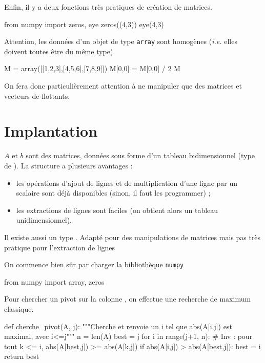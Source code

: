 Enfin, il y a deux fonctions très pratiques de création de matrices.
\begin{pyconsole}
from numpy import zeros, eye
zeros((4,3))
eye(4,3)
\end{pyconsole}

\begin{rem}
Attention, les données d'un objet de type \texttt{array} sont homogènes (\emph{i.e.} elles doivent toutes être du même type).
\begin{pyconsole}
M = array([[1,2,3],[4,5,6],[7,8,9]])
M[0,0] = M[0,0] / 2
M
\end{pyconsole}
On fera donc particulièrement attention à ne manipuler que des matrices et vecteurs de flottants. 
\end{rem}


\section{Implantation}

$A$ et $b$ sont des matrices, données sous forme d'un tableau bidimensionnel
(type  de ). La structure  a plusieurs avantages : 
\begin{itemize}
\item les opérations d'ajout de lignes et de multiplication d'une ligne par un
scalaire sont déjà disponibles (sinon, il faut les programmer) ;
\item les extractions de lignes sont faciles (on obtient alors un tableau unidimensionnel).
\end{itemize}

\begin{rem}
  Il existe aussi un type . Adapté pour des
manipulations de matrices mais pas très pratique pour l'extraction de
lignes
\end{rem}


On commence bien sûr par charger la bibliothèque \texttt{numpy}
\begin{pyverbatim}
from numpy import array, zeros
\end{pyverbatim}

\medskip{}

Pour chercher un pivot sur la colonne , on effectue une recherche de maximum classique.
\begin{pyverbatim}
def cherche_pivot(A, j):
    """Cherche et renvoie un i tel que abs(A[i,j]) est maximal, avec i<=j"""
    n = len(A)
    best = j
    for i in range(j+1, n):
        # Inv : pour tout k <= i, abs(A[best,j]) >= abs(A[k,j])
        if abs(A[i,j]) > abs(A[best,j]):
            best = i
    return best
\end{pyverbatim}


